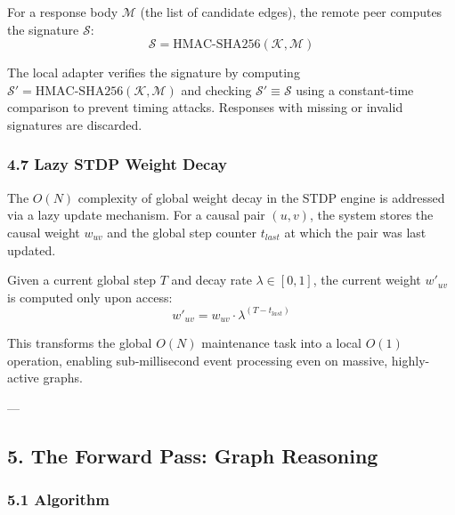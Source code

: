 \documentclass[10pt,journal,compsoc]{IEEEtran}
\begin{document}
For a response body $\mathcal{M}$ (the list of candidate edges), the remote peer computes the signature $\mathcal{S}$:
\begin{equation}
\mathcal{S} = \text{HMAC-SHA256}(\mathcal{K}, \mathcal{M})
\end{equation}

The local adapter verifies the signature by computing $\mathcal{S}' = \text{HMAC-SHA256}(\mathcal{K}, \mathcal{M})$ and checking $\mathcal{S}' \equiv \mathcal{S}$ using a constant-time comparison to prevent timing attacks. Responses with missing or invalid signatures are discarded.

\subsubsection{4.7 Lazy STDP Weight Decay}

The $O(N)$ complexity of global weight decay in the STDP engine is addressed via a lazy update mechanism. For a causal pair $(u, v)$, the system stores the causal weight $w_{uv}$ and the global step counter $t_{last}$ at which the pair was last updated.

Given a current global step $T$ and decay rate $\lambda \in [0, 1]$, the current weight $w'_{uv}$ is computed only upon access:
\begin{equation}
w'_{uv} = w_{uv} \cdot \lambda^{(T - t_{last})}
\end{equation}

This transforms the global $O(N)$ maintenance task into a local $O(1)$ operation, enabling sub-millisecond event processing even on massive, highly-active graphs.

---

\subsection{5. The Forward Pass: Graph Reasoning}

\subsubsection{5.1 Algorithm}
\end{document}
